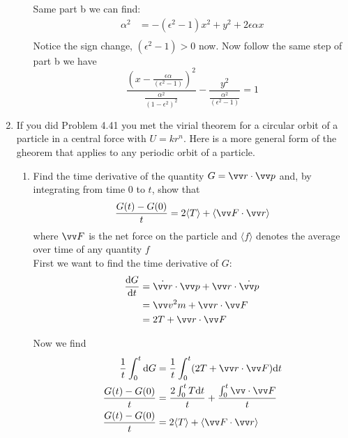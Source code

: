 \documentclass{article}
\newcommand{\de}{\mathrm{d}}
\begin{document}
\begin{enumerate}
\begin{enumerate}
            Same part b we can find:
            \begin{align*}
                \alpha^2 &= -(\epsilon^2 - 1)x^2+ y^2 + 2\epsilon\alpha x \\
            \end{align*}
            Notice the sign change, $(\epsilon^2 - 1) > 0$ now. Now follow the same step of part b we have
            \[
            \frac{(x - \frac{\epsilon \alpha}{(\epsilon^2-1)})^2}{\frac{\alpha^2}{(1-\epsilon^2)^2}} - \frac{ y^2}{\frac{\alpha^2}{(\epsilon^2-1)}}  = 1
            \]

        \end{enumerate}
        \item If you did Problem 4.41 you met the virial theorem for a circular orbit of a particle in a central force with $U = k r^n$. Here is a more general form of the gheorem that applies to any periodic orbit of a particle.
        \begin{enumerate}
            \item Find the time derivative of the quantity $G = \vv r \cdot \vv p$ and, by integrating from time 0 to $t$, show that
            \[
            \frac{G(t) - G(0)}{t} = 2\langle T \rangle + \langle \vv F \cdot \vv r \rangle
            \]
            where $\vv F$ is the net force on the particle and $\langle f \rangle$ denotes the average over time of any quantity $f$\\

            First we want to find the time derivative of $G$:
            \begin{align*}
                \frac{\de G}{\de t} &= \dot{\vv r} \cdot \vv p + \vv r \cdot \dot{\vv p} \\
                                    &= \vv v^2 m + \vv r \cdot \vv F \\
                                    &= 2T + \vv r \cdot \vv F
            \end{align*}

            Now we find
            \begin{align*}
                \frac{1}{t} \int_0^t \de G &= \frac{1}{t}\int_0^t (2T + \vv r \cdot \vv F) \de t \\
                \frac{G(t) - G(0)}{t} &= \frac{2\int_0^t T \de t}{t} + \frac{\int_0^t \vv \cdot \vv F}{t} \\
                \frac{G(t) - G(0)}{t} &= 2\langle T \rangle + \langle \vv F \cdot \vv r \rangle
            \end{align*}




\end{enumerate}
\end{enumerate}
\end{document}
